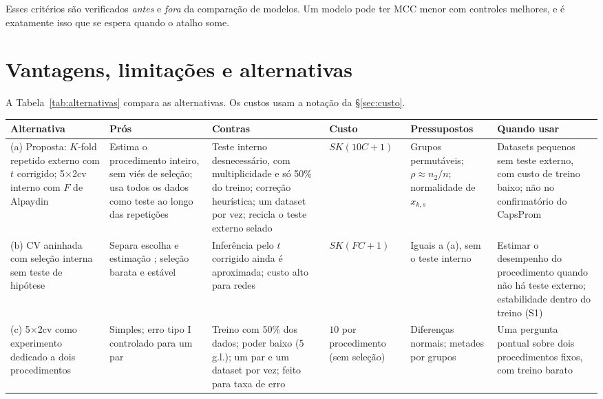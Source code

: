 \documentclass[11pt,a4paper]{article}
\begin{document}
Esses critérios são verificados \emph{antes} e \emph{fora} da comparação de modelos. Um modelo pode ter MCC menor com controles melhores, e é exatamente isso que se espera quando o atalho some.

\section{Vantagens, limitações e alternativas}
\label{sec:alternativas}

A Tabela~\ref{tab:alternativas} compara as alternativas. Os custos usam a notação da \S\ref{sec:custo}.

\begin{landscape}
{\centering\scriptsize
{}
\label{tab:alternativas}
\begin{tabularx}{\linewidth}{L{2.9cm}YYL{2.4cm}YY}
\toprule
Alternativa & Prós & Contras & Custo & Pressupostos & Quando usar \\
\midrule
(a) Proposta: $K$-fold repetido externo com $t$ corrigido; 5$\times$2cv interno com $F$ de Alpaydin & Estima o procedimento inteiro, sem viés de seleção; usa todos os dados como teste ao longo das repetições & Teste interno desnecessário, com multiplicidade e só 50\% do treino; correção heurística; um dataset por vez; recicla o teste externo selado & $SK(10C+1)$ & Grupos permutáveis; $\rho\approx n_2/n$; normalidade de $x_{k,s}$ & Datasets pequenos sem teste externo, com custo de treino baixo; não no confirmatório do CapsProm \\
(b) CV aninhada com seleção interna sem teste de hipótese & Separa escolha e estimação \citep{varma2006,cawley2010}; seleção barata e estável & Inferência pelo $t$ corrigido ainda é aproximada; custo alto para redes & $SK(FC+1)$ & Iguais a (a), sem o teste interno & Estimar o desempenho do procedimento quando não há teste externo; estabilidade dentro do treino (S1) \\
(c) 5$\times$2cv como experimento dedicado a dois procedimentos & Simples; erro tipo I controlado para um par \citep{dietterich1998,alpaydin1999} & Treino com 50\% dos dados; poder baixo (5 g.l.); um par e um dataset por vez; feito para taxa de erro & $10$ por procedimento (sem seleção) & Diferenças normais; metades por grupos & Uma pergunta pontual sobre dois procedimentos fixos, com treino barato \\

\end{tabularx}}
\end{landscape}
\end{document}
